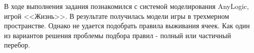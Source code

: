 
В ходе выполнения задания познакомился с системой моделирования AnyLogic, игрой <<Жизнь>>.
В результате получилась модели игры в трехмерном пространстве.
Однако не удается подобрать правила выживания ячеек.
Как один из вариантов решения проблемы подбора правил - полный или частичный перебор.

\clearpage
